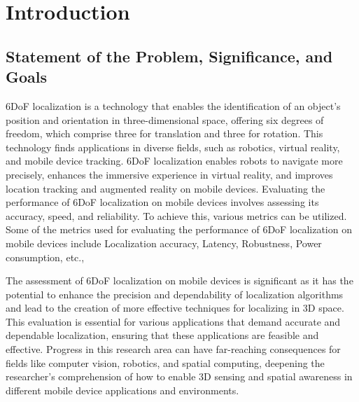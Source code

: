 \documentclass[sigconf]{acmart}
\begin{document}
\section{Introduction}

\subsection{Statement of the Problem, Significance, and Goals}
6DoF localization is a technology that enables the identification of an object's position and orientation in three-dimensional space, offering six degrees of freedom, which comprise three for translation and three for rotation. This technology finds applications in diverse fields, such as robotics, virtual reality, and mobile device tracking. 6DoF localization enables robots to navigate more precisely, enhances the immersive experience in virtual reality, and improves location tracking and augmented reality on mobile devices. Evaluating the performance of 6DoF localization\cite{benchmarking6dof} on mobile devices involves assessing its accuracy, speed, and reliability. To achieve this, various metrics can be utilized. Some of the metrics used for evaluating the performance of 6DoF localization on mobile devices include Localization accuracy, Latency, Robustness, Power consumption, etc., 


The assessment of 6DoF localization on mobile devices is significant as it has the potential to enhance the precision and dependability of localization algorithms\cite{6DOFfuturework} and lead to the creation of more effective techniques for localizing in 3D space. This evaluation is essential for various applications that demand accurate and dependable localization, ensuring that these applications are feasible and effective. Progress in this research area can have far-reaching consequences for fields like computer vision, robotics, and spatial computing, deepening the researcher’s comprehension of how to enable 3D sensing and spatial awareness in different mobile device applications and environments.
\end{document}
